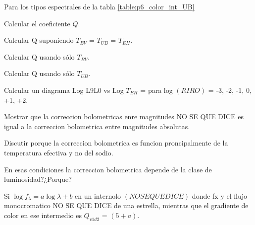 \documentclass[12pt,a4paper]{practice}
\begin{document}
    \begin{problem}\label{prob:8}
        Para los tipos espectrales de la tabla \ref{table:p6_color_int_UB}

            \begin{ppart}\label{prob:8:a}
                Calcular el coeficiente $Q$.
            \end{ppart}

            \begin{ppart}\label{prob:8:b}
                Calcular Q suponiendo $T_{BV}$ = $T_{UB}$ = $T_{EH}$.
            \end{ppart}

            \begin{ppart}\label{prob:8:c}
                Calcular Q usando sólo $T_{BV}$.
            \end{ppart}

            \begin{ppart}\label{prob:8:d}
                Calcular Q usando sólo $T_{UB}$.
            \end{ppart}
    \end{problem}

    \newpage
    \begin{problem}\label{prob:9}
        Calcular un diagrama Log L9L0 vs Log $T_{EH}$ = para log $\left(RIRO\right)$ = -3, -2, -1, 0, +1, +2.

            \begin{ppart}\label{prob:9:a}
                Mostrar que la correccion bolometricas enre magnitudes NO SE QUE DICE  es igual a la correccion bolometrica entre magnitudes absolutas.
            \end{ppart}
    \end{problem}

    \begin{problem}\label{prob:10}
        Discutir porque la correccion bolometrica es funcion proncipalmente de la temperatura efectiva y no del sodio.

        En esas condiciones la correccion bolometrica depende de la clase de luminosidad?¿Porque?
    \end{problem}

    \begin{problem}\label{prob:11}
        Si $\log f_{\lambda} = a\log\lambda + b$ en un internolo $\left(NO SE QUE DICE\right)$ donde fx y el flujo monocromatico NO SE QUE DICE de una estrella, mientras que el gradiente de color en ese intermedio es $Q_{v1d2}$ = $\left(5+a\right)$.
    \end{problem}
\end{document}
